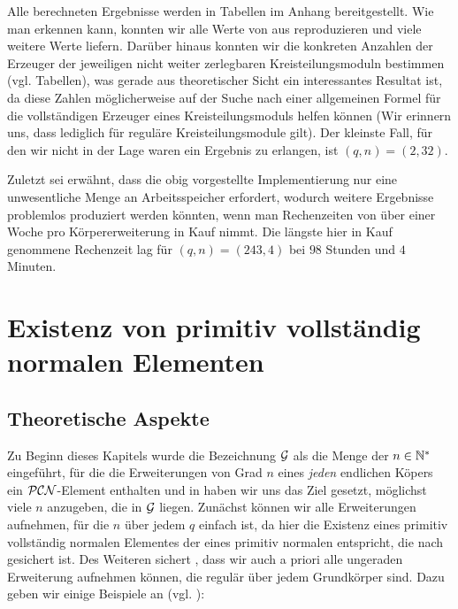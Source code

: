 Alle berechneten Ergebnisse werden in Tabellen im Anhang bereitgestellt.
Wie man erkennen kann, konnten wir alle Werte von 
\citeauthor{morgan1996} aus \autocite{morgan1996} reproduzieren
und viele weitere Werte liefern. Darüber
hinaus konnten wir die konkreten Anzahlen der Erzeuger der jeweiligen 
nicht weiter zerlegbaren Kreisteilungsmoduln bestimmen (vgl. Tabellen), 
was gerade aus theoretischer Sicht ein interessantes Resultat ist, da diese
Zahlen möglicherweise auf der Suche nach einer allgemeinen Formel für die
vollständigen Erzeuger eines Kreisteilungsmoduls helfen können (Wir erinnern
uns, dass  lediglich für 
reguläre Kreisteilungsmodule gilt). 
Der kleinste Fall, für den wir nicht in der Lage waren ein Ergebnis zu
erlangen, ist $(q,n) = (2,32)$.

Zuletzt sei erwähnt, dass die obig vorgestellte Implementierung nur
eine unwesentliche Menge an Arbeitsspeicher erfordert, wodurch weitere
Ergebnisse problemlos produziert werden könnten, wenn man Rechenzeiten von über
einer Woche pro Körpererweiterung in Kauf nimmt. Die längste hier in Kauf
genommene Rechenzeit lag für $(q,n)=(243,4)$ bei $98$ Stunden und $4$ Minuten.



\pagebreak
\section{Existenz von primitiv vollständig normalen Elementen}
\label{sec:existenz_pcn}

\subsection{Theoretische Aspekte}

Zu Beginn dieses Kapitels wurde die Bezeichnung $\mathcal{G}$ als die Menge der
$n\in \mathbb{N}^\ast$ eingeführt, für die die Erweiterungen von Grad $n$ eines 
\emph{jeden} endlichen Köpers ein $\mathcal{PCN}$-Element enthalten und in
 haben wir uns das Ziel gesetzt, möglichst viele $n$
anzugeben, die in $\mathcal{G}$ liegen. Zunächst können wir alle Erweiterungen
aufnehmen, für die $n$ über jedem $q$ einfach ist,
da hier die Existenz eines primitiv vollständig normalen Elementes
der eines primitiv normalen entspricht, die nach 
 gesichert ist. 
Des Weiteren sichert , dass wir auch 
a priori alle ungeraden Erweiterung aufnehmen können, die regulär über jedem
Grundkörper sind. Dazu geben wir einige Beispiele an 
(vgl. \autocite[Abschnitt vor Section 2]{hachenberger2001}):

